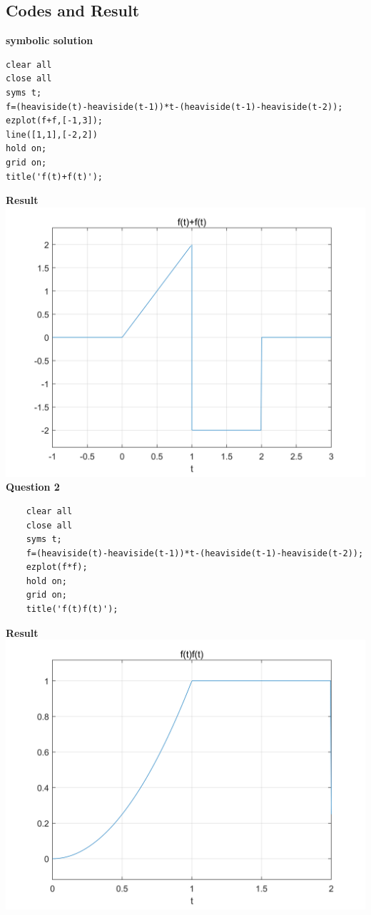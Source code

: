 \documentclass[UTF8,a4paper]{article}
\begin{document}
\subsection{Codes and Result}
\textbf{symbolic solution}
\begin{lstlisting}
clear all
close all
syms t;
f=(heaviside(t)-heaviside(t-1))*t-(heaviside(t-1)-heaviside(t-2));
ezplot(f+f,[-1,3]);
line([1,1],[-2,2])
hold on;
grid on;
title('f(t)+f(t)');
\end{lstlisting}
\textbf{Result}\\
\includegraphics[scale=0.6]{符号法1-1.png}\\
\textbf{Question 2}\\
\begin{lstlisting}
    clear all
    close all
    syms t;
    f=(heaviside(t)-heaviside(t-1))*t-(heaviside(t-1)-heaviside(t-2));
    ezplot(f*f);
    hold on;
    grid on;
    title('f(t)f(t)');
\end{lstlisting}
\textbf{Result}\\
\includegraphics[scale=0.6]{符号1-2.png}\\
\end{document}
